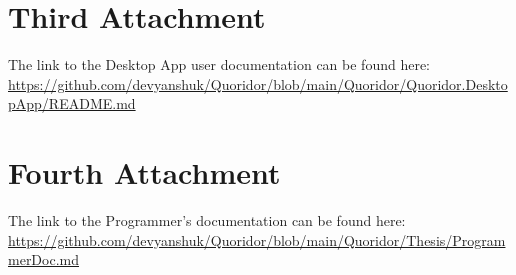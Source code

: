 \documentclass[12pt,a4paper]{report}
\let\openright=\clearpage
\begin{document}
\section{Third Attachment}
\label{app:desktopapp}
The link to the Desktop App user documentation can be found here: \url{https://github.com/devyanshuk/Quoridor/blob/main/Quoridor/Quoridor.DesktopApp/README.md}

\section{Fourth Attachment}
\label{app:programmerdoc}
The link to the Programmer's documentation can be found here:
\url{https://github.com/devyanshuk/Quoridor/blob/main/Quoridor/Thesis/ProgrammerDoc.md}


\openright
\end{document}
